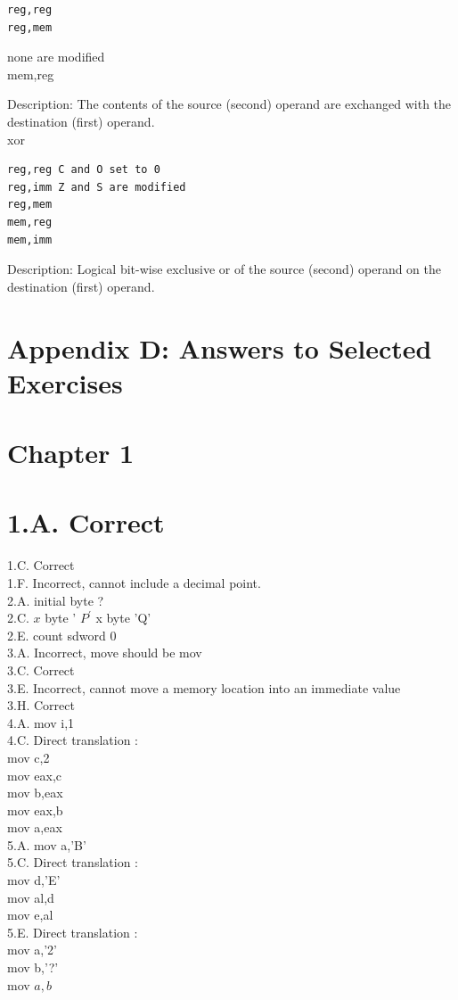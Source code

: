 \documentclass[10pt]{book}
\begin{document}
\begin{verbatim}
reg,reg
reg,mem
\end{verbatim}

none are modified\\
mem,reg

Description: The contents of the source (second) operand are exchanged with the destination (first) operand.\\
xor

\begin{verbatim}
reg,reg C and O set to 0
reg,imm Z and S are modified
reg,mem
mem,reg
mem,imm
\end{verbatim}

Description: Logical bit-wise exclusive or of the source (second) operand on the destination (first) operand.

\section*{Appendix D: Answers to Selected Exercises}
\section*{Chapter 1}
\section*{1.A. Correct}
1.C. Correct\\
1.F. Incorrect, cannot include a decimal point.\\
2.A. initial byte ?\\
2.C. $x$ byte ' $P^{\prime}$ x byte 'Q'\\
2.E. count sdword 0\\
3.A. Incorrect, move should be mov\\
3.C. Correct\\
3.E. Incorrect, cannot move a memory location into an immediate value\\
3.H. Correct\\
4.A. mov i,1\\
4.C. Direct translation :\\
mov c,2\\
mov eax,c\\
mov b,eax\\
mov eax,b\\
mov a,eax\\
5.A. mov a,'B'\\
5.C. Direct translation :\\
mov d,'E'\\
mov al,d\\
mov e,al\\
5.E. Direct translation :\\
mov a,'2'\\
mov b,'?'\\
mov $a, b$
\end{document}
